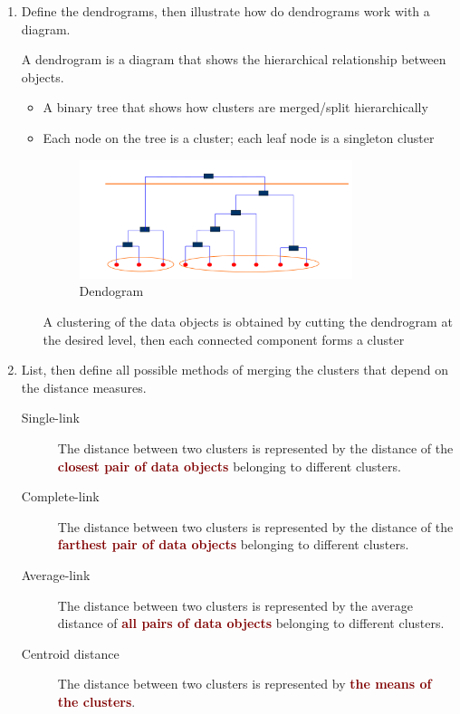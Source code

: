 \documentclass[12pt]{article}
\newenvironment{QandA}{\begin{enumerate}[label=\bfseries\arabic*.]\bfseries}
{\end{enumerate}}
\newenvironment{answered}{\par\normalfont\color{Sepia}}{}
\begin{document}
\begin{QandA}
    \item Define the dendrograms, then illustrate how do dendrograms work with a diagram.
    \begin{answered}
        A dendrogram is a diagram that shows the hierarchical relationship
        between objects.
        \begin{itemize}
            \item A binary tree that shows how clusters are merged/split hierarchically
            \item Each node on the tree is a cluster; each leaf node is a singleton cluster
            \begin{figure}[H]
                \centering
                \includegraphics[width=0.8\textwidth]{dendogram.png}
                \caption{Dendogram}
                \label{fig:dendogram}
            \end{figure}

            A clustering of the data objects is obtained by cutting the dendrogram
            at the desired level, then each connected component forms a cluster
        \end{itemize}
    \end{answered}

    \item List, then define all possible methods of merging the clusters that depend on the distance measures.
    \begin{answered}
        \begin{description}
            \item[Single-link] The distance between two clusters is represented by
                               the distance of the \textcolor{Maroon}{\textbf{closest pair of data objects}}
                               belonging to different clusters.
            \item[Complete-link] The distance between two clusters is represented by
                                 the distance of the \textcolor{Maroon}{\textbf{farthest pair of data objects}}
                                 belonging to different clusters.
            \item[Average-link] The distance between two clusters is represented by
                                the average distance of \textcolor{Maroon}{\textbf{all pairs of data objects}}
                                belonging to different clusters.
            \item[Centroid distance] The distance between two clusters is represented by
                                     \textcolor{Maroon}{\textbf{the means of the clusters}}.
        \end{description}
    \end{answered}


\end{QandA}
\end{document}
